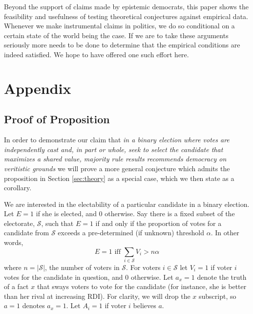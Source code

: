 \documentclass[11pt]{article}
\begin{document}
Beyond the support of claims made by epistemic democrats, this paper shows the feasibility and usefulness of testing theoretical conjectures against empirical data. Whenever we make instrumental claims in politics, we do so conditional on a certain state of the world being the case. If we are to take these arguments seriously more needs to be done to determine that the empirical conditions are indeed satisfied. We hope to have offered one such effort here.



\section{Appendix}
\subsection{Proof of Proposition}


In order to demonstrate our claim that \emph{in a binary election where votes are independently cast and, in part or whole, seek to select the candidate that maximizes a shared value, majority rule results recommends democracy on veritistic grounds}
we will prove a more general conjecture which admits the proposition in Section \ref{sec:theory} as a special case, which we then state as a corollary.

We are interested in the electability of a particular candidate in a binary election. Let $E=1$ if she is elected, and 0 otherwise.
Say there is a fixed subset of the electorate, $\mathcal{S}$, such that $E=1$ if and only if the proportion of votes for a candidate from $\mathcal{S}$ exceeds a pre-determined (if unknown) threshold $\alpha$. In other words,
\begin{equation}
E =1 \text{ iff } \sum_{i\in \mathcal{S}} V_i>n\alpha
\end{equation}
where $n=|\mathcal{S}|$, the number of voters in $\mathcal{S}$.
For voters $i\in \mathcal{S}$ let $V_i=1$ if voter $i$ votes for the candidate in question, and 0 otherwise.
Let $a_x=1$ denote the truth of a fact $x$ that sways voters to vote for the candidate (for instance, she is better than her rival at increasing RDI).
For clarity, we will drop the $x$ subscript, so $a=1$ denotes $a_x=1$.
Let $A_i=1$ if voter $i$ believes $a$.
\end{document}
